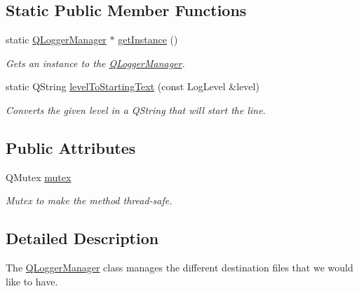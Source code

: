 \subsection*{Static Public Member Functions}
\begin{DoxyCompactItemize}
\item 
static \mbox{\hyperlink{class_q_logger_1_1_q_logger_manager}{Q\+Logger\+Manager}} $\ast$ \mbox{\hyperlink{class_q_logger_1_1_q_logger_manager_a5d6305b64fa8cee64386576b0be74030}{get\+Instance}} ()
\begin{DoxyCompactList}\small\item\em Gets an instance to the \mbox{\hyperlink{class_q_logger_1_1_q_logger_manager}{Q\+Logger\+Manager}}. \end{DoxyCompactList}\item 
static Q\+String \mbox{\hyperlink{class_q_logger_1_1_q_logger_manager_ab52ab18b57d37af78cbeec50b31b790f}{level\+To\+Starting\+Text}} (const Log\+Level \&level)
\begin{DoxyCompactList}\small\item\em Converts the given level in a Q\+String that will start the line. \end{DoxyCompactList}\end{DoxyCompactItemize}
\subsection*{Public Attributes}
\begin{DoxyCompactItemize}
\item 
\mbox{\label{class_q_logger_1_1_q_logger_manager_ae03dea2e1d77ba17b9d96a52fad582a0}} 
Q\+Mutex \mbox{\hyperlink{class_q_logger_1_1_q_logger_manager_ae03dea2e1d77ba17b9d96a52fad582a0}{mutex}}
\begin{DoxyCompactList}\small\item\em Mutex to make the method thread-\/safe. \end{DoxyCompactList}\end{DoxyCompactItemize}


\subsection{Detailed Description}
The \mbox{\hyperlink{class_q_logger_1_1_q_logger_manager}{Q\+Logger\+Manager}} class manages the different destination files that we would like to have. 

